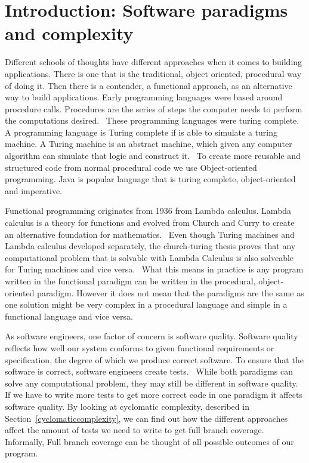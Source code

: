 \chapter{Introduction: Software paradigms and complexity}\label{introduction}

Different schools of thoughts have different approaches when it comes to
building applications. There is one that is the traditional, object oriented,
procedural way of doing it. Then there is a contender, a functional approach, as
an alternative way to build applications.  Early programming languages were
based around procedure calls. Procedures are the series of steps the computer
needs to perform the computations desired.~\cite{proceduralprogramming} These
programming languages were turing complete. A programming language is Turing
complete if is able to simulate a turing machine. A Turing machine is an
abstract machine, which given any computer algorithm can simulate that logic and
construct it.~\cite{turingmachine}  To create more reusable and structured code
from normal procedural code we use Object-oriented programming.  Java is popular
language that is turing complete, object-oriented and imperative.~\cite{java} 

Functional programming originates from 1936 from Lambda calculus. Lambda
calculus is a theory for functions and evolved from Church and Curry to create
an alternative foundation for mathematics.~\cite{Turner} Even though Turing
machines and Lambda calculus developed separately, the church-turing thesis
proves that any computational problem that is solvable with Lambda Calculus is
also solveable for Turing machines and vice versa.~\cite{sep-church-turing} What
this means in practice is any program written in the functional paradigm can be
written in the procedural, object-oriented paradigm. However it does not mean
that the paradigms are the same as one solution might be very complex in a
procedural language and simple in a functional language and vice versa. 

As software engineers, one factor of concern is software quality. Software
quality reflects how well our system conforms to given functional requirements
or specification, the degree of which we produce correct software. To ensure
that the software is correct, software engineers create
tests.~\cite{Pressman:2004:SEP:994110} While both paradigms can solve any
computational problem, they may still be different in software quality. If we
have to write more tests to get more correct code in one paradigm it affects
software quality. By looking at cyclomatic complexity, described in
Section~\ref{cyclomaticcomplexity}, we can find out how the different approaches
affect the amount of tests we need to write to get full branch
coverage. Informally, Full branch coverage can be thought of all
possible outcomes of our program.

